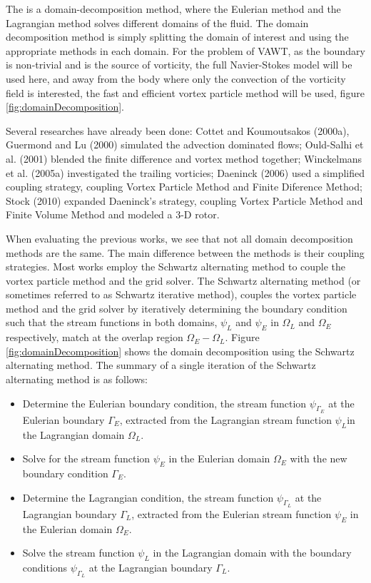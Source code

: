 The  is a domain-decomposition method, where the Eulerian method and the Lagrangian method solves different domains of the fluid. The domain decomposition method is simply splitting the domain of interest and using the appropriate methods in each domain. For the problem of VAWT, as the boundary is non-trivial and is the source of vorticity, the full Navier-Stokes model will be used here, and away from the body where only the convection of the vorticity field is interested, the fast and efficient vortex particle method will be used, figure \ref{fig:domainDecomposition}.

Several researches have already been done: Cottet and Koumoutsakos (2000a)\cite{Cottet2000a}, Guermond and Lu (2000) \cite{Guermond2000a} simulated the advection dominated flows; Ould-Salhi et al. (2001) \cite{Ould-Salihi2001a} blended the finite difference and vortex method together; Winckelmans et al. (2005a) \cite{Winckelmans2005} investigated the trailing vorticies; Daeninck (2006) \cite{Daeninck2006} used a simplified coupling strategy, coupling Vortex Particle Method and Finite Diference Method; Stock (2010) \cite{Stock2010a} expanded Daeninck's strategy, coupling Vortex Particle Method and Finite Volume Method and modeled a 3-D rotor.

When evaluating the previous works, we see that not all domain decomposition methods are the same. The main difference between the methods is their coupling strategies. Most works employ the Schwartz alternating method to couple the vortex particle method and the grid solver. The Schwartz alternating method (or sometimes referred to as Schwartz iterative method), couples the vortex particle method and the grid solver by iteratively determining the boundary condition such that the stream functions in both domains, $\psi_L$ and $\psi_E$ in $\Omega_L$ and $\Omega_E$ respectively, match at the overlap region $\Omega_E-\Omega_L$. Figure \ref{fig:domainDecomposition} shows the domain decomposition using the Schwartz alternating method. The summary of a single iteration of the Schwartz alternating method is as follows:
	\begin{itemize}
	\item Determine the Eulerian boundary condition, the stream function $\psi_{\Gamma_E}$ at the Eulerian boundary $\Gamma_E$, extracted from the Lagrangian stream function $\psi_L$in the Lagrangian domain $\Omega_L$.
	\item Solve for the stream function $\psi_E$ in the Eulerian domain $\Omega_E$ with the new boundary condition $\Gamma_E$.
	\item Determine the Lagrangian condition, the stream function $\psi_{\Gamma_L}$ at the Lagrangian boundary $\Gamma_L$, extracted from the Eulerian stream function $\psi_E$ in the Eulerian domain $\Omega_E$.
	\item Solve the stream function $\psi_L$ in the Lagrangian domain with the boundary conditions $\psi_{\Gamma_L}$ at the Lagrangian boundary $\Gamma_L$.
	\end{itemize}
	
